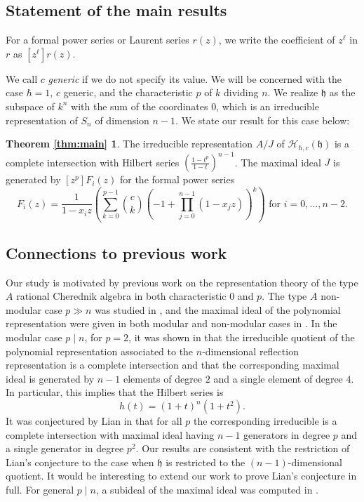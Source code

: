 \documentclass{amsart}
\numberwithin{equation}{section}
\theoremstyle{definition}
\newcommand{\h}{\mathfrak{h}}
\newcommand{\HH}{\mathcal{H}}
\begin{document}
\subsection{Statement of the main results}

For a formal power series or Laurent series $r(z)$, we write the coefficient of $z^\ell$ in $r$ as $[z^\ell]r(z)$. 

 We call $c$ {\it generic} if we do not specify its value. We will be concerned with the case $\hbar=1$, $c$ generic, and the characteristic $p$ of $k$ dividing $n$. We realize $\h$ as the subspace of $k^n$ with the sum of the coordinates $0$, which is an irreducible representation of $S_n$ of dimension $n-1$. We state our result for this case below:
 
 \newtheorem*{thm:main}{Theorem \ref{thm:main}}
\begin{thm:main} The irreducible representation $A/J$  of $\HH_{\hbar,c}(\h)$ is a complete intersection with  Hilbert series $\left(\frac{1-t^p}{1-t}\right)^{n-1}$. The maximal ideal $J$ is generated by $[z^p]F_i(z)$ for the formal power series
\[
F_i(z)=\frac{1}{1-x_iz} \left( \sum_{k=0}^{p-1} \binom{c}{k}(-1+\prod_{j=0}^{n-1} (1-x_jz))^k\right) \text{ for $i=0,\dots,n-2$}.
\]
\end{thm:main}


\subsection{Connections to previous work}

Our study is motivated by previous work on the representation theory of the type $A$ rational Cherednik algebra in both characteristic $0$ and $p$.  The type $A$ non-modular case $p \gg n$ was studied in \cite{BFG}, and the maximal ideal of the polynomial representation were given in both modular and non-modular cases in \cite{BC1}.  In the modular case $p \mid n$, for $p = 2$, it was shown in \cite[Theorem 5.1]{L} that the irreducible quotient of the polynomial representation associated to the $n$-dimensional reflection representation is a complete intersection and that the corresponding maximal ideal is generated by $n - 1$ elements of degree $2$ and a single element of degree $4$.  In particular, this implies that the Hilbert series is 
\[
h(t) = (1 + t)^n (1 + t^2).
\]
It was conjectured by Lian in \cite[Conjecture 5.2]{L} that for all $p$ the corresponding irreducible is a complete intersection with maximal ideal having $n - 1$ generators in degree $p$ and a single generator in degree $p^2$.  Our results are consistent with the restriction of Lian's conjecture to the case when $\h$ is restricted to the $(n - 1)$-dimensional quotient.  It would be interesting to extend our work to prove Lian's conjecture in full.  For general $p \mid n$, a subideal of the maximal ideal was computed in \cite[Proposition 6.1]{DS}.
\end{document}
